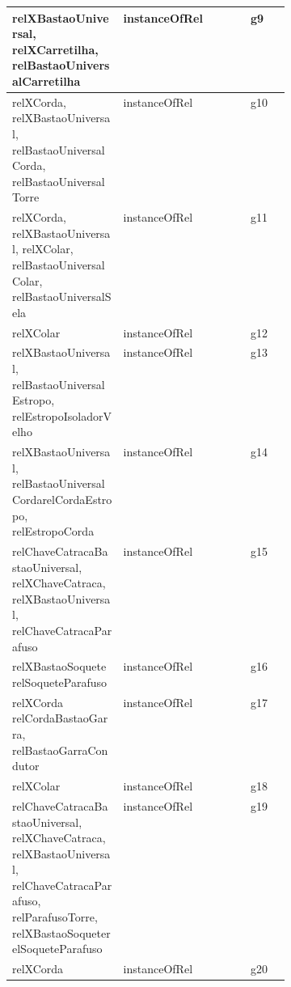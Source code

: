 \begin{center}
\begin{longtable}[H]{|p{0.4\linewidth}|l|l|}
relXBastaoUniversal, relXCarretilha, relBastaoUniversalCarretilha                                                             						& instanceOfRel              		 & g9         \\ \hline
relXCorda, relXBastaoUniversal, relBastaoUniversalCorda, relBastaoUniversalTorre                                               						& instanceOfRel              		 & g10        \\ \hline
relXCorda, relXBastaoUniversal, relXColar, relBastaoUniversalColar, relBastaoUniversalSela                                      					& instanceOfRel              		 & g11        \\ \hline
relXColar                                                                                                                   						& instanceOfRel              		 & g12        \\ \hline
relXBastaoUniversal, relBastaoUniversalEstropo, relEstropoIsoladorVelho                                                       						& instanceOfRel              		 & g13        \\ \hline
relXBastaoUniversal, relBastaoUniversalCordarelCordaEstropo, relEstropoCorda                                                  						& instanceOfRel              		 & g14        \\ \hline
relChaveCatracaBastaoUniversal, relXChaveCatraca, relXBastaoUniversal, relChaveCatracaParafuso                                 						& instanceOfRel              		 & g15        \\ \hline
relXBastaoSoquete relSoqueteParafuso                                                                                        						& instanceOfRel              		 & g16        \\ \hline
relXCorda relCordaBastaoGarra, relBastaoGarraCondutor                                                                        						& instanceOfRel              		 & g17        \\ \hline
relXColar                                                                                                       									& instanceOfRel              		 & g18        \\ \hline
relChaveCatracaBastaoUniversal, relXChaveCatraca, relXBastaoUniversal, relChaveCatracaParafuso, relParafusoTorre, relXBastaoSoqueterelSoqueteParafuso    & instanceOfRel              		 & g19        \\ \hline
relXCorda                                                                                                       									& instanceOfRel              		 & g20        \\ \hline

\end{longtable}
\end{center}
